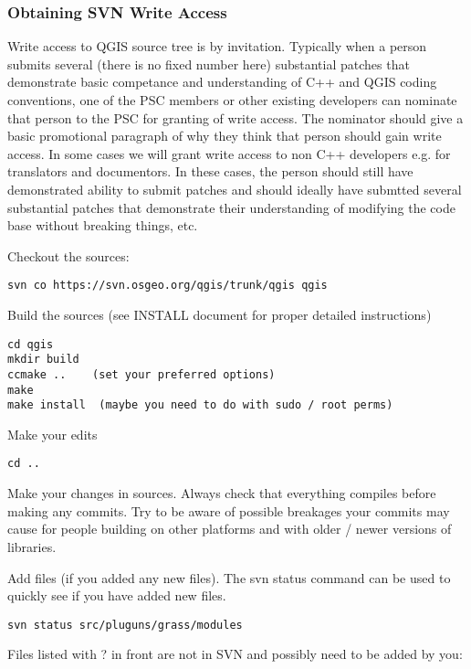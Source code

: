 \subsubsection{Obtaining SVN Write Access}
Write access to QGIS source tree is by invitation. Typically when a person
submits several (there is no fixed number here) substantial patches that
demonstrate basic competance and understanding of C++ and QGIS coding
conventions, one of the PSC members or other existing developers can nominate
that person to the PSC for granting of write access. The nominator should give
a basic promotional paragraph of why they think that person should gain write
access. In some cases we will grant write access to non C++ developers e.g. for
translators and documentors.  In these cases, the person should still have
demonstrated ability to submit patches and should ideally have submtted several
substantial patches that demonstrate their understanding of modifying the code
base without breaking things, etc.

Checkout the sources:

\begin{verbatim}
svn co https://svn.osgeo.org/qgis/trunk/qgis qgis
\end{verbatim}

Build the sources (see INSTALL document for proper detailed instructions)

\begin{verbatim}
cd qgis
mkdir build
ccmake ..    (set your preferred options)
make
make install  (maybe you need to do with sudo / root perms)
\end{verbatim}

Make your edits

\begin{verbatim}
cd ..
\end{verbatim}

Make your changes in sources. Always check that everything compiles before
making any commits.  Try to be aware of possible breakages your commits may
cause for people building on other platforms and with older / newer versions of
libraries.

Add files (if you added any new files). The svn status command can be used to
quickly see if you have added new files.

\begin{verbatim}
svn status src/pluguns/grass/modules
\end{verbatim}

Files listed with ? in front are not in SVN and possibly need to be added by
you:

